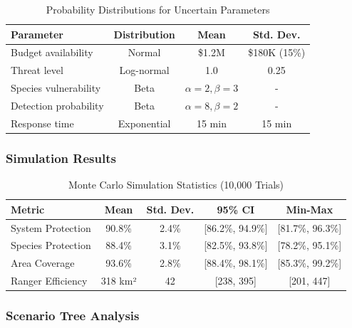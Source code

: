 \begin{table}[h]
\centering
\caption{Probability Distributions for Uncertain Parameters}
\begin{tabular}{lccc}
\hline
\textbf{Parameter} & \textbf{Distribution} & \textbf{Mean} & \textbf{Std. Dev.} \\
\hline
Budget availability & Normal & \$1.2M & \$180K (15\%) \\
Threat level & Log-normal & 1.0 & 0.25 \\
Species vulnerability & Beta & $\alpha=2, \beta=3$ & - \\
Detection probability & Beta & $\alpha=8, \beta=2$ & - \\
Response time & Exponential & 15 min & 15 min \\
\hline
\end{tabular}
\end{table}

\subsubsection{Simulation Results}

\begin{table}[h]
\centering
\caption{Monte Carlo Simulation Statistics (10,000 Trials)}
\begin{tabular}{lcccc}
\hline
\textbf{Metric} & \textbf{Mean} & \textbf{Std. Dev.} & \textbf{95\% CI} & \textbf{Min-Max} \\
\hline
System Protection & 90.8\% & 2.4\% & [86.2\%, 94.9\%] & [81.7\%, 96.3\%] \\
Species Protection & 88.4\% & 3.1\% & [82.5\%, 93.8\%] & [78.2\%, 95.1\%] \\
Area Coverage & 93.6\% & 2.8\% & [88.4\%, 98.1\%] & [85.3\%, 99.2\%] \\
Ranger Efficiency & 318 km² & 42 & [238, 395] & [201, 447] \\
\hline
\end{tabular}
\end{table}

\subsubsection{Scenario Tree Analysis}

